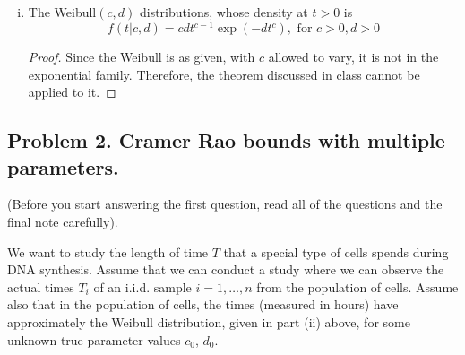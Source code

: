 \documentclass[letterpaper, 12pt]{article}\usepackage[]{graphicx}\usepackage[]{color}
\begin{document}
\begin{enumerate}[(a)]
\begin{enumerate}[(i)]
\begin{proof}
For the Gamma$(a,b)$, the natural parameter space is 
\[
\{
(a-1, -b) : a, b > 0
\}
\]
This contains a rectangle, for example
\[
\{
(a,b) : 1 \leq a \leq 2, -1 \leq b \leq -2
\}
\]
According to the theorem, found on Lecture 4, slide 4, the MSS is also complete.
\end{proof}

\item
The Weibull$(c,d)$ distributions, whose density at $t>0$ is
\[
f(t|c,d) = cdt^{c-1}\exp(-dt^c), \text{ for }c>0, d>0
\]

\begin{proof}
Since the Weibull is as given, with $c$ allowed to vary, it is not in the exponential family. Therefore, the theorem discussed in class cannot be applied to it.
\end{proof}
\end{enumerate}
\end{enumerate}

\subsection*{Problem 2. Cramer Rao bounds with multiple parameters.}
(Before you start answering the ﬁrst question, read all of the questions and the ﬁnal note carefully).

We want to study the length of time $T$ that a special type of cells spends during DNA synthesis. Assume
that we can conduct a study where we can observe the actual times $T_i$ of an i.i.d. sample $i = 1, \dots, n$ from
the population of cells. Assume also that in the population of cells, the times (measured in hours) have
approximately the Weibull distribution, given in part (ii) above, for some unknown true parameter values
$c_0$, $d_0$.
\end{document}
